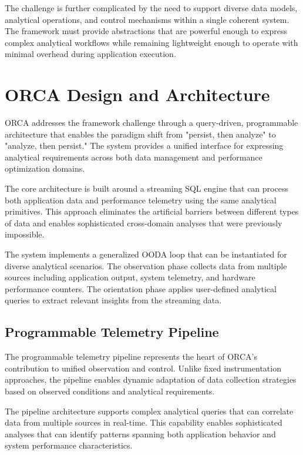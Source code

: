 The challenge is further complicated by the need to support diverse data models, analytical
operations, and control mechanisms within a single coherent system.
The framework must provide abstractions that are powerful enough to express complex analytical
workflows while remaining lightweight enough to operate with minimal overhead during application
execution.

\section{ORCA Design and Architecture}

ORCA addresses the framework challenge through a query-driven, programmable architecture that
enables the paradigm shift from "persist, then analyze" to "analyze, then persist."
The system provides a unified interface for expressing analytical requirements across both data
management and performance optimization domains.

The core architecture is built around a streaming SQL engine that can process both application
data and performance telemetry using the same analytical primitives.
This approach eliminates the artificial barriers between different types of data and enables
sophisticated cross-domain analyses that were previously impossible.

The system implements a generalized OODA loop that can be instantiated for diverse analytical
scenarios.
The observation phase collects data from multiple sources including application output, system
telemetry, and hardware performance counters.
The orientation phase applies user-defined analytical queries to extract relevant insights from
the streaming data.

\subsection{Programmable Telemetry Pipeline}

The programmable telemetry pipeline represents the heart of ORCA's contribution to unified
observation and control.
Unlike fixed instrumentation approaches, the pipeline enables dynamic adaptation of data
collection strategies based on observed conditions and analytical requirements.

The pipeline architecture supports complex analytical queries that can correlate data from
multiple sources in real-time.
This capability enables sophisticated analyses that can identify patterns spanning both
application behavior and system performance characteristics.

